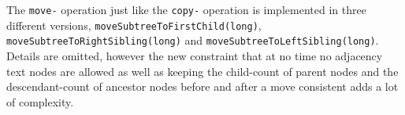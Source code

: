 



The \texttt{move-} operation just like the \texttt{copy-} operation is implemented in three different versions, \texttt{moveSubtreeToFirstChild(long)}, \\\texttt{moveSubtreeToRightSibling(long)} and \texttt{moveSubtreeToLeftSibling(long)}. Details are omitted, however the new constraint that at no time no adjacency text nodes are allowed as well as keeping the child-count of parent nodes and the descendant-count of ancestor nodes before and after a move consistent adds a lot of complexity. %

